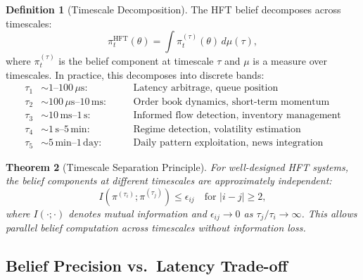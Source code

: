\documentclass[12pt,a4paper]{article}
\newtheorem{theorem}{Theorem}[section]
\theoremstyle{definition}
\newtheorem{definition}[theorem]{Definition}
\begin{document}
\begin{definition}[Timescale Decomposition]\label{def:timescales}
The HFT belief decomposes across timescales:
\begin{equation}\label{eq:timescale-decomposition}
  \pi_t^{\mathrm{HFT}}(\theta) = \int \pi_t^{(\tau)}(\theta)\, d\mu(\tau),
\end{equation}
where $\pi_t^{(\tau)}$ is the belief component at timescale $\tau$ and $\mu$ is a measure over timescales. In practice, this decomposes into discrete bands:
\begin{align}
  \tau_1 &\sim 1\text{--}100\,\mu\mathrm{s}: &\quad &\text{Latency arbitrage, queue position} \\
  \tau_2 &\sim 100\,\mu\mathrm{s}\text{--}10\,\mathrm{ms}: &\quad &\text{Order book dynamics, short-term momentum} \\
  \tau_3 &\sim 10\,\mathrm{ms}\text{--}1\,\mathrm{s}: &\quad &\text{Informed flow detection, inventory management} \\
  \tau_4 &\sim 1\,\mathrm{s}\text{--}5\,\mathrm{min}: &\quad &\text{Regime detection, volatility estimation} \\
  \tau_5 &\sim 5\,\mathrm{min}\text{--}1\,\mathrm{day}: &\quad &\text{Daily pattern exploitation, news integration}
\end{align}
\end{definition}

\begin{theorem}[Timescale Separation Principle]\label{thm:timescale-separation}
For well-designed HFT systems, the belief components at different timescales are approximately independent:
\begin{equation}
  I(\pi^{(\tau_i)}; \pi^{(\tau_j)}) \leq \epsilon_{ij} \quad \text{for } |i-j| \geq 2,
\end{equation}
where $I(\cdot;\cdot)$ denotes mutual information and $\epsilon_{ij} \to 0$ as $\tau_j/\tau_i \to \infty$. This allows parallel belief computation across timescales without information loss.
\end{theorem}

\subsection{Belief Precision vs.\ Latency Trade-off}
\end{document}
